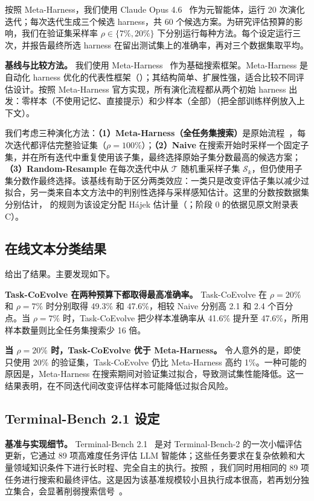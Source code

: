 \documentclass{article}
\begin{document}
按照 Meta-Harness，我们使用 Claude Opus 4.6~\citep{anthropic2026claudeopus46} 作为元智能体，运行 20 次演化迭代；每次迭代生成三个候选 harness，共 60 个候选方案。为研究评估预算的影响，我们在验证集采样率 $\rho \in \{7\%, 20\%\}$ 下分别运行每种方法。每个设定运行三次，并报告最终所选 harness 在留出测试集上的准确率，再对三个数据集取平均。

\textbf{基线与比较方法。}
我们使用 Meta-Harness~\citep{lee2026meta} 作为基础搜索框架。Meta-Harness 是自动化 harness 优化的代表性框架（）；其结构简单、扩展性强，适合比较不同评估设计。按照 Meta-Harness 官方实现，所有演化流程都从两个初始 harness 出发：零样本（不使用记忆、直接提示）和少样本（全部）（把全部训练样例放入上下文）。

我们考虑三种演化方法：\textbf{（1）Meta-Harness（全任务集搜索）}是原始流程~\citep{lee2026meta}，每次迭代都评估完整验证集（$\rho=100\%$）；\textbf{（2）Naive} 在搜索开始时采样一个固定子集，并在所有迭代中重复使用该子集，最终选择原始子集分数最高的候选方案；\textbf{（3）Random-Resample} 在每次迭代中从 $\mathcal{T}$ 随机重采样子集 $\mathcal{S}_k$，但仍使用子集分数作最终选择。该基线有助于区分两类效应：一类只是改变评估子集以减少过拟合，另一类来自本文方法中的判别性选择与采样感知估计。这里的分数按数据集分别估计， 的规则为该设定分配 H\'ajek 估计量（；阶段 0 的依据见原文附录表 C）。

\subsection{在线文本分类结果}
\label{subsec:result_text-classification}
 给出了结果。主要发现如下。


\textbf{Task-CoEvolve 在两种预算下都取得最高准确率。}
Task-CoEvolve 在 $\rho{=}20\%$ 和 $\rho{=}7\%$ 时分别取得 49.3\% 和 47.6\%，相较 Naive 分别高 2.1 和 2.4 个百分点。当 $\rho{=}7\%$ 时，Task-CoEvolve 把少样本准确率从 41.6\% 提升至 47.6\%，所用样本数量则比全任务集搜索少 16 倍。

\textbf{当 $\rho=20\%$ 时，Task-CoEvolve 优于 Meta-Harness。}
令人意外的是，即使只使用 20\% 的验证集，Task-CoEvolve 仍比 Meta-Harness 高约 1\%。一种可能的原因是，Meta-Harness 在搜索期间对验证集过拟合，导致测试集性能降低。这一结果表明，在不同迭代间改变评估样本可能降低过拟合风险。

\subsection{Terminal-Bench 2.1 设定}
\label{subsec:setup_terminal}
\textbf{基准与实现细节。}
Terminal-Bench 2.1~\citep{merrill2026terminal} 是对 Terminal-Bench-2 的一次小幅评估更新，它通过 89 项高难度任务评估 LLM 智能体；这些任务要求在复杂依赖和大量领域知识条件下进行长时程、完全自主的执行。按照 \citet{lee2026meta}，我们同时用相同的 89 项任务进行搜索和最终评估。这是因为该基准规模较小且执行成本很高，若再划分独立集合，会显著削弱搜索信号~\citep{lee2026meta}。
\end{document}
